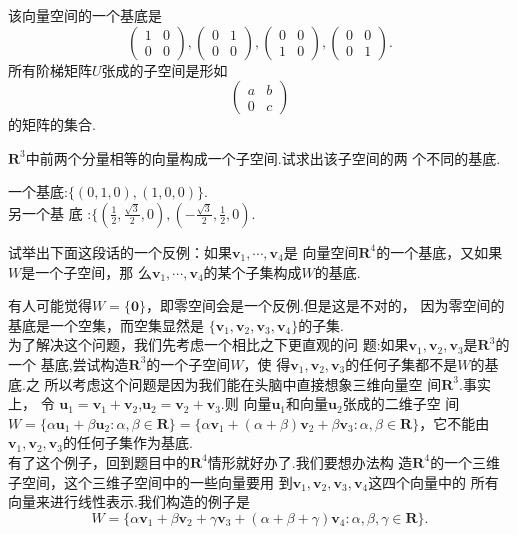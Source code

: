 ﻿\documentclass{book} \usepackage{exsheets} \usepackage{xeCJK}
\begin{document}
\begin{solution}
  该向量空间的一个基底是
$$
\begin{pmatrix}
  1&0\\
  0&0
\end{pmatrix},
\begin{pmatrix}
  0&1\\
  0&0
\end{pmatrix},
\begin{pmatrix}
  0&0\\
  1&0
\end{pmatrix},
\begin{pmatrix}
  0&0\\
  0&1
\end{pmatrix}.
$$所有阶梯矩阵$U$张成的子空间是形如
$$
\begin{pmatrix}
  a&b\\
  0&c
\end{pmatrix}
$$
的矩阵的集合.
\end{solution}
\begin{question}
  $\mathbf{R}^3$中前两个分量相等的向量构成一个子空间.试求出该子空间的两
  个不同的基底.
\end{question}
\begin{solution}
  一个基底:$\{(0,1,0),(1,0,0)\}$.\\
  另一个基
  底
  :$\{(\frac{1}{2},\frac{\sqrt{3}}{2},0),(-\frac{\sqrt{3}}{2},\frac{1}{2},0)$.
\end{solution}
\begin{question}
  试举出下面这段话的一个反例：如果$\mathbf{v}_1,\cdots,\mathbf{v}_4$是
  向量空间$\mathbf{R}^4$的一个基底，又如果$W$是一个子空间，那
  么$\mathbf{v}_1,\cdots,\mathbf{v}_4$的某个子集构成$W$的基底.
\end{question}
\begin{solution}
  有人可能觉得$W=\{\mathbf{0}\}$，即零空间会是一个反例.但是这是不对的，
  因为零空间的基底是一个空集，而空集显然是
  $\{\mathbf{v}_1,\mathbf{v}_2,\mathbf{v}_3,\mathbf{v}_4\}$的子集.\\

  为了解决这个问题，我们先考虑一个相比之下更直观的问
  题:如果$\mathbf{v}_1,\mathbf{v}_2,\mathbf{v}_3$是$\mathbf{R}^3$的一个
  基底,尝试构造$\mathbf{R}^3$的一个子空间$W$，使
  得$\mathbf{v}_1,\mathbf{v}_2,\mathbf{v}_3$的任何子集都不是$W$的基底.之
  所以考虑这个问题是因为我们能在头脑中直接想象三维向量空
  间$\mathbf{R}^3$.事实上，
  令
  $\mathbf{u}_1=\mathbf{v}_1+\mathbf{v}_2$,$\mathbf{u}_2=\mathbf{v}_2+\mathbf{v}_3$.则
  向量$\mathbf{u}_1$和向量$\mathbf{u}_2$张成的二维子空
  间$W=\{\alpha\mathbf{u}_1+\beta\mathbf{u}_2:\alpha,\beta\in
  \mathbf{R}\}=\{\alpha\mathbf{v}_1+(\alpha+\beta)\mathbf{v}_2+\beta
  \mathbf{v}_3:\alpha,\beta\in \mathbf{R}\}$，它不能由
  $\mathbf{v}_1,\mathbf{v}_2,\mathbf{v}_3$的任何子集作为基底.\\

  有了这个例子，回到题目中的$\mathbf{R}^4$情形就好办了.我们要想办法构
  造$\mathbf{R}^4$的一个三维子空间，这个三维子空间中的一些向量要用
  到$\mathbf{v}_1,\mathbf{v}_2,\mathbf{v}_3,\mathbf{v}_4$这四个向量中的
  所有向量来进行线性表示.我们构造的例子是
$$
W=\{\alpha\mathbf{v}_1+\beta\mathbf{v}_2+\gamma\mathbf{v}_3+(\alpha+\beta+\gamma)\mathbf{v}_4:\alpha,\beta,\gamma\in\mathbf{R}\}.
$$
\end{solution}
\end{document}
